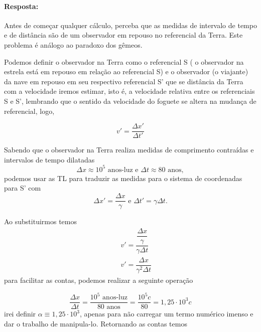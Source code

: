 \documentclass[10pt,a4paper]{article}
\begin{document}
	\paragraph{Resposta:}
	Antes de começar qualquer cálculo, perceba que as medidas de intervalo de tempo e de distância são de um observador em repouso no referencial da Terra. Este problema é análogo ao paradoxo dos gêmeos.
	
	Podemos definir o observador na Terra como o referencial S ( o observador na estrela está em repouso em relação ao referencial S) e o observador (o viajante) da nave em repouso em seu respectivo referencial S' que se distância da Terra com a velocidade iremos estimar, isto é, a velocidade relativa entre os referenciais S e S', lembrando que o sentido da velocidade do foguete se altera na mudança de referencial, logo,
	
	\begin{equation}\label{v_foguete}
		  v' = \dfrac{\Delta x'}{\Delta t'}
	\end{equation}
	
	Sabendo que o observador na Terra realiza medidas de comprimento contraídas e intervalos de tempo dilatadas
	\begin{equation}
		\Delta x \approx 10^5 \text{  anos-luz    e  } \Delta t \approx \text{80 anos},
	\end{equation}
	podemos usar as TL para traduzir as medidas para o sistema de coordenadas para S' com
	\begin{equation}\label{TL_repouso}
		\Delta x' = \dfrac{\Delta x}{\gamma}\text{  e  } \Delta t' = \gamma\Delta t.
	\end{equation}

	Ao substituirmos temos
	\begin{eqnarray}
		&& v' = \dfrac{\dfrac{\Delta x}{\gamma}}{\gamma\Delta t} \nonumber \\
		&& v' = \dfrac{\Delta x}{\gamma^2\Delta t}\nonumber
	\end{eqnarray}
	para facilitar as contas, podemos realizar a seguinte operação
	
	\begin{equation}\nonumber
		\dfrac{\Delta x}{\Delta t } = \dfrac{10^5 \text{  anos-luz}}{80\text{ anos}} = \dfrac{10^5c}{80} = 1,25\cdot10^3c
	\end{equation}
	irei definir $ \alpha\equiv 1,25\cdot10^3 $, apenas para não carregar um termo numérico imenso e dar o trabalho de manipula-lo. Retornando as contas temos
	
\end{document}
